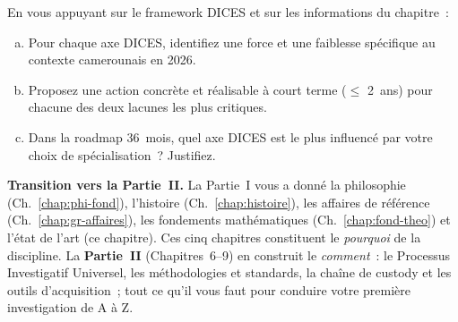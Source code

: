 \begin{boxexo}[title={\ding{45}\quad Exercice~5.3 --- Analyse DICES du Cameroun \niveauexpert}]
En vous appuyant sur le framework DICES et sur les informations du
chapitre~:
\begin{enumerate}[(a)]
    \item Pour chaque axe DICES, identifiez une force et une faiblesse
          spécifique au contexte camerounais en 2026.
    \item Proposez une action concrète et réalisable à court terme
          ($\leq$ 2~ans) pour chacune des deux lacunes les plus critiques.
    \item Dans la roadmap 36~mois, quel axe DICES est le plus influencé
          par votre choix de spécialisation~? Justifiez.
\end{enumerate}
\end{boxexo}

\bigskip

\begin{boxinfo}
\textbf{Transition vers la Partie~II.} La Partie~I vous a donné
la philosophie (Ch.~\ref{chap:phi-fond}), l'histoire
(Ch.~\ref{chap:histoire}), les affaires de référence
(Ch.~\ref{chap:gr-affaires}), les fondements mathématiques
(Ch.~\ref{chap:fond-theo}) et l'état de l'art (ce chapitre). Ces
cinq chapitres constituent le \emph{pourquoi} de la discipline. La
\textbf{Partie~II} (Chapitres~6--9) en construit le \emph{comment}~:
le Processus Investigatif Universel, les méthodologies et standards,
la chaîne de custody et les outils d'acquisition~; tout ce qu'il vous
faut pour conduire votre première investigation de A à Z.
\end{boxinfo}
